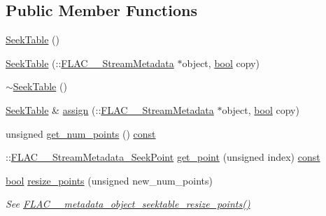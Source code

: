 \subsection*{Public Member Functions}
\begin{DoxyCompactItemize}
\item 
\hyperlink{class_f_l_a_c_1_1_metadata_1_1_seek_table_afc3c768da0edce2d99d8fc8df1b977d7}{Seek\+Table} ()
\item 
\hyperlink{class_f_l_a_c_1_1_metadata_1_1_seek_table_accd82ef77dcc489280c0f46e443b16c7}{Seek\+Table} (\+::\hyperlink{struct_f_l_a_c_____stream_metadata}{F\+L\+A\+C\+\_\+\+\_\+\+Stream\+Metadata} $\ast$object, \hyperlink{mac_2config_2i386_2lib-src_2libsoxr_2soxr-config_8h_abb452686968e48b67397da5f97445f5b}{bool} copy)
\item 
\hyperlink{class_f_l_a_c_1_1_metadata_1_1_seek_table_abdc1465d1d81b8f4162a4714bb98bd8f}{$\sim$\+Seek\+Table} ()
\item 
\hyperlink{class_f_l_a_c_1_1_metadata_1_1_seek_table}{Seek\+Table} \& \hyperlink{class_f_l_a_c_1_1_metadata_1_1_seek_table_ad9d0036938d6ad1c81180cf1e156b844}{assign} (\+::\hyperlink{struct_f_l_a_c_____stream_metadata}{F\+L\+A\+C\+\_\+\+\_\+\+Stream\+Metadata} $\ast$object, \hyperlink{mac_2config_2i386_2lib-src_2libsoxr_2soxr-config_8h_abb452686968e48b67397da5f97445f5b}{bool} copy)
\item 
unsigned \hyperlink{class_f_l_a_c_1_1_metadata_1_1_seek_table_a93cff964ac7d802b4def31c97ee3d181}{get\+\_\+num\+\_\+points} () \hyperlink{getopt1_8c_a2c212835823e3c54a8ab6d95c652660e}{const} 
\item 
\+::\hyperlink{struct_f_l_a_c_____stream_metadata___seek_point}{F\+L\+A\+C\+\_\+\+\_\+\+Stream\+Metadata\+\_\+\+Seek\+Point} \hyperlink{class_f_l_a_c_1_1_metadata_1_1_seek_table_ad65cb18a8237186881d167a369bec3cf}{get\+\_\+point} (unsigned index) \hyperlink{getopt1_8c_a2c212835823e3c54a8ab6d95c652660e}{const} 
\item 
\hyperlink{mac_2config_2i386_2lib-src_2libsoxr_2soxr-config_8h_abb452686968e48b67397da5f97445f5b}{bool} \hyperlink{class_f_l_a_c_1_1_metadata_1_1_seek_table_a8b52cd4e3d1893073d5fc299efd9f466}{resize\+\_\+points} (unsigned new\+\_\+num\+\_\+points)
\begin{DoxyCompactList}\small\item\em See \hyperlink{group__flac__metadata__object_ga836f94fa622ece4f50dadf27c7ec107a}{F\+L\+A\+C\+\_\+\+\_\+metadata\+\_\+object\+\_\+seektable\+\_\+resize\+\_\+points()} \end{DoxyCompactList}\item 

\end{DoxyCompactItemize}
